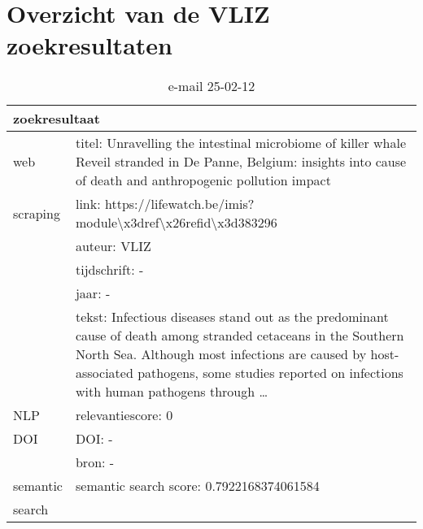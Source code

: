 \section{Overzicht van de VLIZ zoekresultaten}
\begin{table}[h!]
    \caption{e-mail 25-02-12}
    \centering
    \begin{tabularx}{\textwidth}{|p{4cm}|X|} 
        \hline
        \multicolumn{2}{|X|}{\textbf{zoekresultaat}} \\
        \hline
        web &titel: Unravelling the intestinal microbiome of killer whale Reveil stranded in De Panne, Belgium: insights into cause of death and anthropogenic pollution impact\\
        scraping&link: https://lifewatch.be/imis?module\textbackslash x3dref\textbackslash x26refid\textbackslash x3d383296\\
        &auteur: VLIZ\\
        &tijdschrift: -\\
        &jaar: -\\
        &tekst: Infectious diseases stand out as the predominant cause of death among stranded cetaceans in the Southern North Sea. Although most infections are caused by host-associated pathogens, some studies reported on infections with human pathogens through …\\
        \hline
        NLP&relevantiescore: 0\\
        \hline
        DOI&DOI: -\\
        &bron: -\\
        \hline
        semantic&semantic search score: 0.7922168374061584\\
        search&\\
        \hline
    \end{tabularx}
    \label{table:email20250212}
\end{table}
